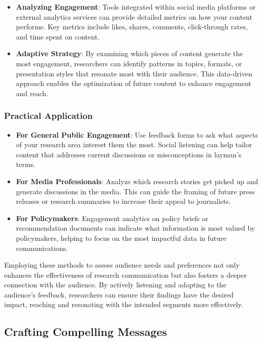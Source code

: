 \documentclass[
]{book}
\providecommand{\tightlist}{%
  \setlength{\itemsep}{0pt}\setlength{\parskip}{0pt}}
\begin{document}
\begin{itemize}
\tightlist
\item
  \textbf{Analyzing Engagement}: Tools integrated within social media platforms or external analytics services can provide detailed metrics on how your content performs. Key metrics include likes, shares, comments, click-through rates, and time spent on content.
\item
  \textbf{Adaptive Strategy}: By examining which pieces of content generate the most engagement, researchers can identify patterns in topics, formats, or presentation styles that resonate most with their audience. This data-driven approach enables the optimization of future content to enhance engagement and reach.
\end{itemize}

\hypertarget{practical-application}{%
\subsubsection{Practical Application}\label{practical-application}}

\begin{itemize}
\tightlist
\item
  \textbf{For General Public Engagement}: Use feedback forms to ask what aspects of your research area interest them the most. Social listening can help tailor content that addresses current discussions or misconceptions in layman's terms.
\item
  \textbf{For Media Professionals}: Analyze which research stories get picked up and generate discussions in the media. This can guide the framing of future press releases or research summaries to increase their appeal to journalists.
\item
  \textbf{For Policymakers}: Engagement analytics on policy briefs or recommendation documents can indicate what information is most valued by policymakers, helping to focus on the most impactful data in future communications.
\end{itemize}

Employing these methods to assess audience needs and preferences not only enhances the effectiveness of research communication but also fosters a deeper connection with the audience. By actively listening and adapting to the audience's feedback, researchers can ensure their findings have the desired impact, reaching and resonating with the intended segments more effectively.

\hypertarget{crafting-compelling-messages}{%
\subsection*{Crafting Compelling Messages}\label{crafting-compelling-messages}}
\end{document}
